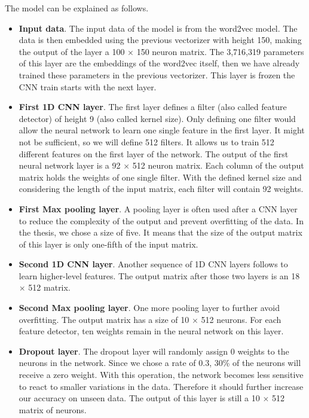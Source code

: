 The model can be explained as follows.
\begin{itemize}
	\item \textbf{Input data}. The input data of the model is from the word2vec model. The data is then embedded using the previous vectorizer with height 150, making the output of the layer a 100 $\times$ 150 neuron matrix. The 3,716,319 parameters of this layer are the embeddings of the word2vec itself, then we have already trained these parameters in the previous vectorizer. This layer is frozen the CNN train starts with the next layer.
	\newpage
	\item \textbf{First 1D CNN layer}. The first layer defines a filter (also called feature detector) of height 9 (also called kernel size). Only defining one filter would allow the neural network to learn one single feature in the first layer. It might not be sufficient, so we will define 512 filters. It allows us to train 512 different features on the first layer of the network. The output of the first neural network layer is a 92 $\times$ 512 neuron matrix. Each column of the output matrix holds the weights of one single filter. With the defined kernel size and considering the length of the input matrix, each filter will contain 92 weights. 
	\item \textbf{First Max pooling layer}. A pooling layer is often used after a CNN layer to reduce the complexity of the output and prevent overfitting of the data. In the thesis, we chose a size of five. It means that the size of the output matrix of this layer is only one-fifth of the input matrix. 
	\item \textbf{Second 1D CNN layer}. Another sequence of 1D CNN layers follows to learn higher-level features. The output matrix after those two layers is an 18 $\times$ 512 matrix. 
	\item \textbf{Second Max pooling layer}. One more pooling layer to further avoid overfitting. The output matrix has a size of 10 $\times$ 512 neurons. For each feature detector, ten weights remain in the neural network on this layer. 
	\item \textbf{Dropout layer}. The dropout layer will randomly assign 0 weights to the neurons in the network. Since we chose a rate of 0.3, 30\% of the neurons will receive a zero weight. With this operation, the network becomes less sensitive to react to smaller variations in the data. Therefore it should further increase our accuracy on unseen data. The output of this layer is still a 10 $\times$ 512 matrix of neurons. 

\end{itemize}
